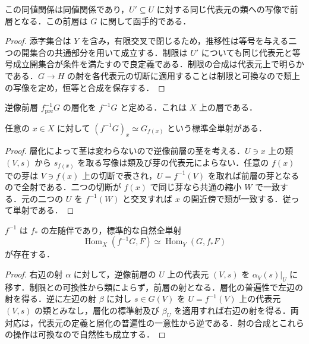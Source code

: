 \begin{prop}[逆像前層の構成]
この同値関係は同値関係であり，$U'\subseteq U$ に対する同じ代表元の類への写像で前層となる．この前層は $G$ に関して函手的である．
\end{prop}
\begin{proof}
添字集合は $Y$ を含み，有限交叉で閉じるため，推移性は等号を与える二つの開集合の共通部分を用いて成立する．制限は $U'$ についても同じ代表元と等号成立開集合が条件を満たすので良定義である．制限の合成は代表元上で明らかである．$G\to H$ の射を各代表元の切断に適用することは制限と可換なので類上の写像を定め，恒等と合成を保存する．
\end{proof}
\begin{defn}[逆像層]
逆像前層 $f^{-1}_{\mathrm{pre}}G$ の層化を $f^{-1}G$ と定める．これは $X$ 上の層である．
\end{defn}
\begin{prop}[逆像層の茎]
任意の $x\in X$ に対して $(f^{-1}G)_x\simeq G_{f(x)}$ という標準全単射がある．
\end{prop}
\begin{proof}
層化によって茎は変わらないので逆像前層の茎を考える．$U\ni x$ 上の類 $(V,s)$ から $s_{f(x)}$ を取る写像は類及び芽の代表元によらない．任意の $f(x)$ での芽は $V\ni f(x)$ 上の切断で表され，$U=f^{-1}(V)$ を取れば前層の芽となるので全射である．二つの切断が $f(x)$ で同じ芽なら共通の縮小 $W$ で一致する．元の二つの $U$ を $f^{-1}(W)$ と交叉すれば $x$ の開近傍で類が一致する．従って単射である．
\end{proof}
\begin{prop}[逆像と順像の随伴]
$f^{-1}$ は $f_*$ の左随伴であり，標準的な自然全単射
\[
\operatorname{Hom}_X(f^{-1}G,F)\simeq
\operatorname{Hom}_Y(G,f_*F)
\]
が存在する．
\end{prop}
\begin{proof}
右辺の射 $\alpha$ に対して，逆像前層の $U$ 上の代表元 $(V,s)$ を $\alpha_V(s)|_U$ に移す．制限との可換性から類によらず，前層の射となる．層化の普遍性で左辺の射を得る．逆に左辺の射 $\beta$ に対し $s\in G(V)$ を $U=f^{-1}(V)$ 上の代表元 $(V,s)$ の類とみなし，層化の標準射及び $\beta_U$ を適用すれば右辺の射を得る．両対応は，代表元の定義と層化の普遍性の一意性から逆である．射の合成とこれらの操作は可換なので自然性も成立する．
\end{proof}
